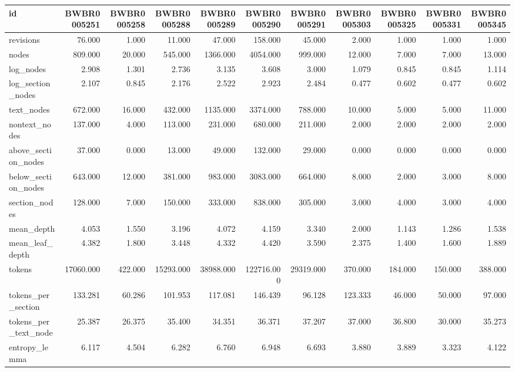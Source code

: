 \begin{tabular}{lrrrrrrrrrr}
\toprule
id & BWBR0005251 & BWBR0005258 & BWBR0005288 & BWBR0005289 & BWBR0005290 & BWBR0005291 & BWBR0005303 & BWBR0005325 & BWBR0005331 & BWBR0005345 \\
\midrule
revisions & 76.000 & 1.000 & 11.000 & 47.000 & 158.000 & 45.000 & 2.000 & 1.000 & 1.000 & 1.000 \\
\cline{1-11}
nodes & 809.000 & 20.000 & 545.000 & 1366.000 & 4054.000 & 999.000 & 12.000 & 7.000 & 7.000 & 13.000 \\
\cline{1-11}
log\_nodes & 2.908 & 1.301 & 2.736 & 3.135 & 3.608 & 3.000 & 1.079 & 0.845 & 0.845 & 1.114 \\
\cline{1-11}
log\_section\_nodes & 2.107 & 0.845 & 2.176 & 2.522 & 2.923 & 2.484 & 0.477 & 0.602 & 0.477 & 0.602 \\
\cline{1-11}
text\_nodes & 672.000 & 16.000 & 432.000 & 1135.000 & 3374.000 & 788.000 & 10.000 & 5.000 & 5.000 & 11.000 \\
\cline{1-11}
nontext\_nodes & 137.000 & 4.000 & 113.000 & 231.000 & 680.000 & 211.000 & 2.000 & 2.000 & 2.000 & 2.000 \\
\cline{1-11}
above\_section\_nodes & 37.000 & 0.000 & 13.000 & 49.000 & 132.000 & 29.000 & 0.000 & 0.000 & 0.000 & 0.000 \\
\cline{1-11}
below\_section\_nodes & 643.000 & 12.000 & 381.000 & 983.000 & 3083.000 & 664.000 & 8.000 & 2.000 & 3.000 & 8.000 \\
\cline{1-11}
section\_nodes & 128.000 & 7.000 & 150.000 & 333.000 & 838.000 & 305.000 & 3.000 & 4.000 & 3.000 & 4.000 \\
\cline{1-11}
mean\_depth & 4.053 & 1.550 & 3.196 & 4.072 & 4.159 & 3.340 & 2.000 & 1.143 & 1.286 & 1.538 \\
\cline{1-11}
mean\_leaf\_depth & 4.382 & 1.800 & 3.448 & 4.332 & 4.420 & 3.590 & 2.375 & 1.400 & 1.600 & 1.889 \\
\cline{1-11}
tokens & 17060.000 & 422.000 & 15293.000 & 38988.000 & 122716.000 & 29319.000 & 370.000 & 184.000 & 150.000 & 388.000 \\
\cline{1-11}
tokens\_per\_section & 133.281 & 60.286 & 101.953 & 117.081 & 146.439 & 96.128 & 123.333 & 46.000 & 50.000 & 97.000 \\
\cline{1-11}
tokens\_per\_text\_node & 25.387 & 26.375 & 35.400 & 34.351 & 36.371 & 37.207 & 37.000 & 36.800 & 30.000 & 35.273 \\
\cline{1-11}
entropy\_lemma & 6.117 & 4.504 & 6.282 & 6.760 & 6.948 & 6.693 & 3.880 & 3.889 & 3.323 & 4.122 \\

\end{tabular}
